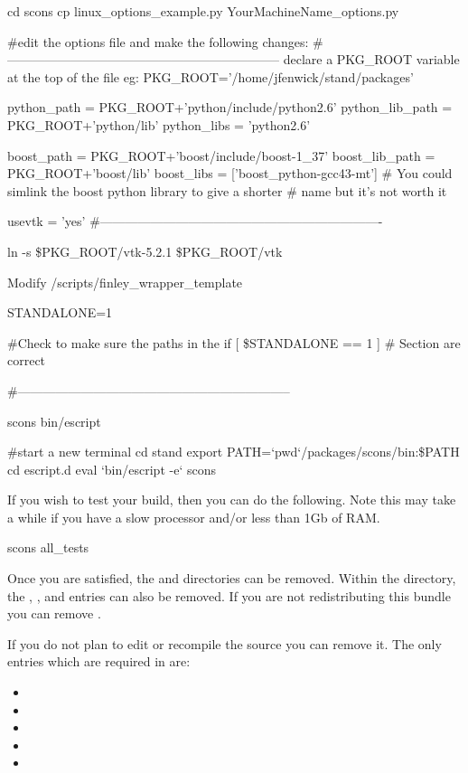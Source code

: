\begin{shellCode}
cd scons
cp linux_options_example.py YourMachineName_options.py

#edit the options file and make the following changes:
#-----------------------------------------------------------------
declare a PKG_ROOT variable at the top of the file eg:
PKG_ROOT='/home/jfenwick/stand/packages'

python_path		= PKG_ROOT+'python/include/python2.6'
python_lib_path		= PKG_ROOT+'python/lib'
python_libs		= 'python2.6'

boost_path		= PKG_ROOT+'boost/include/boost-1_37'
boost_lib_path		= PKG_ROOT+'boost/lib'
boost_libs		= ['boost_python-gcc43-mt']
# You could simlink the boost python library to give a shorter 
# name but it's not worth it

usevtk		= 'yes'
#-------------------------------------------------------------------

ln -s \$PKG_ROOT/vtk-5.2.1 \$PKG_ROOT/vtk

Modify /scripts/finley_wrapper_template

STANDALONE=1

#Check to make sure the paths in the if [ \$STANDALONE == 1 ]
# Section are correct

#-----------------------------------------------------------------

scons bin/escript

#start a new terminal
cd stand
export PATH=`pwd`/packages/scons/bin:\$PATH
cd escript.d
eval `bin/escript -e`
scons
\end{shellCode}

If you wish to test your build, then you can do the following. 
Note this may take a while if you have a slow processor and/or less than 1Gb of RAM.
\begin{shellCode}
scons all_tests
\end{shellCode}

Once you are satisfied, the  and  directories can be removed.
Within the  directory, the , ,  and  entries can also be removed.
If you are not redistributing this bundle you can remove .

If you do not plan to edit or recompile the source you can remove it.
The only entries which are required in  are:
\begin{itemize}
 \item {}
\item {}
\item {}
\item {}
\item {}
\end{itemize}

